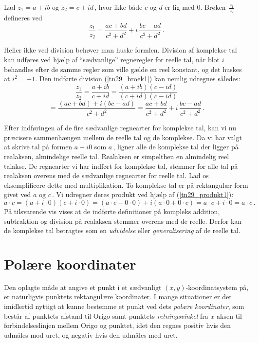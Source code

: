 \begin{definition}\label{tn29_broek}
Lad $z_1=a+ib$ og $z_2=c+id\,$, hvor ikke både $c$ og $d$ er lig med $0$.\bs
Brøken $\,\displaystyle{\frac{z_1}{z_2}}\,$ defineres ved 
\begin{equation}\label{tn29_broek1}
\frac{z_1}{z_2}=\frac{ac+bd}{c^2+d^2}+i\,\frac{bc-ad}{c^2+d^2}\,.
\end{equation}
\end{definition}

\begin{aha}
Heller ikke ved division behøver man huske formlen.  Division af komplekse tal kan udføres ved hjælp af ``sædvanlige'' regneregler for reelle tal, når blot $i$ behandles efter de samme regler som ville gælde en reel konstant, og det huskes at $i^2=-1$. Den indførte division (\ref{tn29_broek1}) kan nemlig udregnes således:\\
$$\frac{z_1}{z_2}=\frac{a+ib}{c+id}
=\frac{(a+ib)(c-id)}{(c+id)(c-id)}$$
$$=\frac{(ac+bd)+i(bc-ad)}{c^2+d^2}
=\frac{ac+bd}{c^2+d^2}+i\,\frac{bc-ad}{c^2+d^2}\,.$$
\end{aha}

Efter indføringen af de fire sædvanlige regnearter for komplekse tal, kan vi nu præcisere sammenhængen mellem de reelle tal og de komplekse. Da vi har valgt at skrive tal på formen $a+i0$ som $a\,$, ligner alle de komplekse tal der ligger på realaksen, almindelige reelle tal. Realaksen er simpelthen en almindelig reel talakse. De regnearter vi har indført for komplekse tal, stemmer for alle tal på realaksen overens med de sædvanlige regnearter for reelle tal. Lad os eksemplificere dette med multiplikation.\bs
To komplekse tal er på rektangulær form givet ved $a$ og $c\,$. Vi udregner deres produkt ved hjælp af (\ref{tn29_produkt1}):
$$
a\cdot c=(a+i\cdot0)(c+i\cdot0)=(a\cdot c-0\cdot0)+i(a\cdot0+0\cdot c)=a\cdot c+i\cdot0=a\cdot c\,.
$$
På tilsvarende vis vises at de indførte definitioner på kompleks addition, subtraktion og division på realaksen stemmer overens med de reelle.\bs
Derfor kan de komplekse tal betragtes som en \textit{udvidelse} eller \textit{generalisering} af de reelle tal.


\section{Polære koordinater}
Den oplagte måde at angive et punkt i et sædvanligt
$(x,y)$-koordinatsystem på, er naturligvis punktets rektangulære koordinater. I mange situationer er det imidlertid nyttigt at kunne bestemme et punkt ved dets \textit{polære koordinater}, som består af punktets afstand til Origo samt punktets \textit{retningsvinkel} fra $x$-aksen til forbindelseslinjen mellem Origo og punktet, idet den regnes positiv hvis den udmåles mod uret, og negativ hvis den udmåles med uret.\bs

